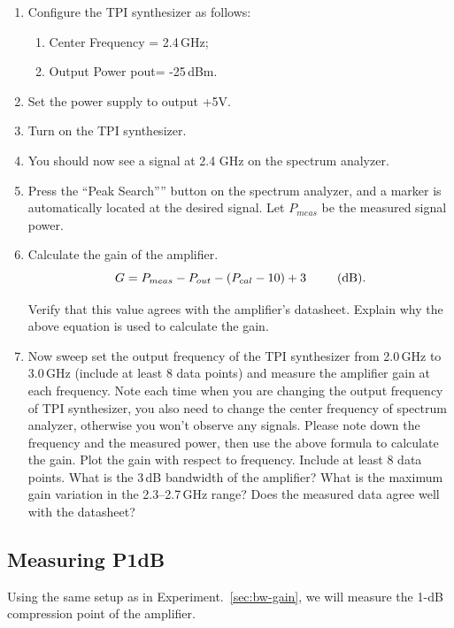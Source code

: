 \documentclass[letterpaper, 11pt]{article}
\begin{document}
\begin{enumerate}
	\item Configure the TPI synthesizer as follows:
		\begin{enumerate}
			\item Center Frequency = 2.4\,GHz;
			\item Output Power pout=  -25\,dBm.
		\end{enumerate}

	\item Set the power supply to output +5V. 
	\item Turn on the TPI synthesizer.
	\item You should now see a signal at 2.4 GHz on the spectrum analyzer.
	\item Press the ``Peak Search”'' button on the spectrum analyzer, and a marker is automatically located at the desired signal. Let $P_{meas}$  be the measured signal power. 
	
	\item Calculate the gain of the amplifier. 
		\[
			G = P_{meas} - P_{out} - (P_{cal} - 10) + 3 \hspace{2.5em} \text{(dB).}
		\]
		
		Verify that this value agrees with the amplifier's datasheet. Explain why the above equation is used to calculate the gain. 
	
	\item Now sweep set the output frequency of the TPI synthesizer from 2.0\,GHz to 3.0\,GHz (include at least 8 data points) and measure the amplifier gain at each frequency. Note each time when you are changing the output frequency of TPI synthesizer, you also need to change the center frequency of spectrum analyzer, otherwise you won't observe any signals. Please note down the frequency and the measured power, then use the above formula to calculate the gain. Plot the gain with respect to frequency. Include at least 8 data points. What is the 3\,dB bandwidth of the amplifier? What is the maximum gain variation in the 2.3--2.7\,GHz range? Does the measured data agree well with the datasheet?
\end{enumerate}

\subsection{Measuring P1dB}
\label{sec:p1db}

Using the same setup as in Experiment.~\ref{sec:bw-gain}, we will measure the 1-dB compression point of the amplifier. 
\end{document}
